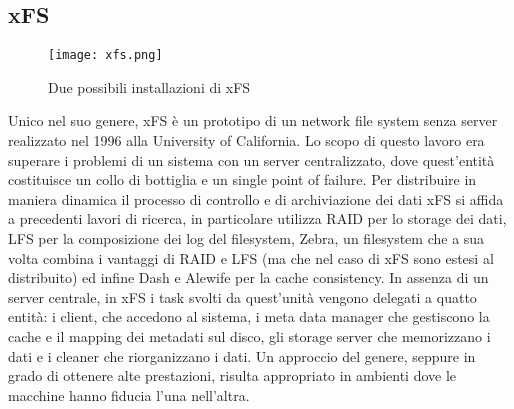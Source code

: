 \subsection{xFS}
\begin{figure}[ht]
  \begin{center}
    \texttt{[image: xfs.png]}
    \caption{Due possibili installazioni di xFS}
    \label{xfs}
  \end{center}
\end{figure}
Unico nel suo genere, xFS è un prototipo di un network file system senza server realizzato nel 1996 alla University of California. Lo scopo di questo lavoro era superare i problemi di un sistema con un server centralizzato, dove quest'entità costituisce un collo di bottiglia e un single point of failure. Per distribuire in maniera dinamica il processo di controllo e di archiviazione dei dati xFS si affida a precedenti lavori di ricerca, in particolare utilizza RAID per lo storage dei dati, LFS per la composizione dei log del filesystem, Zebra, un filesystem che a sua volta combina i vantaggi di RAID e LFS (ma che nel caso di xFS sono estesi al distribuito) ed infine Dash e Alewife per la cache consistency. In assenza di un server centrale, in xFS i task svolti da quest'unità vengono delegati a quatto entità: i client, che accedono al sistema, i meta data manager che gestiscono la cache e il mapping dei metadati sul disco, gli storage server che memorizzano i dati e i cleaner che riorganizzano i dati. Un approccio del genere, seppure in grado di ottenere alte prestazioni, risulta appropriato in ambienti dove le macchine hanno fiducia l'una nell'altra.\cite{anderson96}
